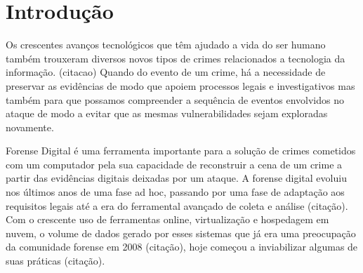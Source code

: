 \documentclass[
	12pt,				%
	openright,			%
	oneside,			%
	a4paper,			%
	english,			%
	french,				%
	spanish,			%
	brazil,				%
	]{abntex2}
\begin{document}
\frenchspacing 


\imprimircapa

\imprimirfolhaderosto


\tableofcontents
\cleardoublepage


\textual

\chapter{Introdução}

Os crescentes avanços tecnológicos que têm ajudado a vida do ser humano também trouxeram diversos novos tipos de crimes relacionados a tecnologia da informação. (citacao)
Quando do evento de um crime, há a necessidade de preservar as evidências de modo que apoiem processos legais e investigativos mas também para que possamos compreender a sequência
de eventos envolvidos no ataque de modo a evitar que as mesmas vulnerabilidades sejam exploradas novamente.

\par

Forense Digital é uma ferramenta importante para a solução de crimes cometidos com um computador pela sua capacidade de reconstruir a cena de um crime a partir das evidências
digitais deixadas por um ataque. A forense digital evoluiu nos últimos anos de uma fase ad hoc, passando por uma fase de adaptação aos requisitos legais até a era do ferramental
avançado de coleta e análise (citação). Com o crescente uso de ferramentas online, virtualização e hospedagem em nuvem, o volume de dados gerado por esses sistemas que já era uma preocupação
da comunidade forense em 2008 (citação), hoje começou a inviabilizar algumas de suas práticas (citação).  
\end{document}
